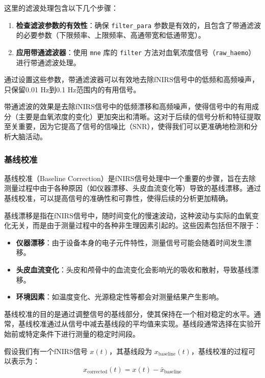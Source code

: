 \documentclass[a4paper,12pt]{article}
\begin{document}
这里的滤波处理包含以下几个步骤：

\begin{enumerate}
    \item \textbf{检查滤波参数的有效性}：确保 \texttt{filter\_para} 参数是有效的，且包含了带通滤波的必要参数（下限频率、上限频率、高通带宽和低通带宽）。
    \item \textbf{应用带通滤波器}：使用 \texttt{mne} 库的 \texttt{filter} 方法对血氧浓度信号（\texttt{raw\_haemo}）进行带通滤波处理。
\end{enumerate}

通过设置这些参数，带通滤波器可以有效地去除fNIRS信号中的低频和高频噪声，只保留0.01 Hz到0.1 Hz范围内的有用信号。

带通滤波的效果是去除fNIRS信号中的低频漂移和高频噪声，使得信号中的有用成分（主要是血氧浓度的变化）更加突出和清晰。这对于后续的信号分析和特征提取至关重要，因为它提高了信号的信噪比（SNR），使得我们可以更准确地检测和分析大脑活动。

\subsubsection{基线校准}

基线校准（Baseline Correction）是fNIRS信号处理中一个重要的步骤，旨在去除测量过程中由于各种原因（如仪器漂移、头皮血流变化等）导致的基线漂移。通过基线校准，可以提高信号的准确性和可靠性，使得后续的分析更加精确。

基线漂移是指在fNIRS信号中，随时间变化的慢速波动，这种波动与实际的血氧变化无关，而是由于测量过程中的各种非生理因素引起的。这些因素包括但不限于：
\begin{itemize}
    \item \textbf{仪器漂移}：由于设备本身的电子元件特性，测量信号可能会随着时间发生漂移。
    \item \textbf{头皮血流变化}：头皮和颅骨中的血流变化会影响光的吸收和散射，导致基线漂移。
    \item \textbf{环境因素}：如温度变化、光源稳定性等都会对测量结果产生影响。
\end{itemize}

基线校准的目的是通过调整信号的基线部分，使其保持在一个相对稳定的水平。通常，基线校准通过从信号中减去基线段的平均值来实现。基线段通常选择在实验开始前或特定条件下进行测量的稳定时间段。

假设我们有一个fNIRS信号 \( x(t) \)，其基线段为 \( x_{\text{baseline}}(t) \)，基线校准的过程可以表示为：
\begin{equation}
x_{\text{corrected}}(t) = x(t) - \bar{x}_{\text{baseline}}
\end{equation}
\end{document}
